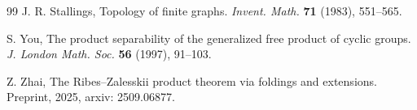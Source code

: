 \documentclass[11pt]{amsart}
\theoremstyle{definition}
\theoremstyle{definition}
\numberwithin{equation}{section}
\begin{document}
\begin{thebibliography}{99}
J. R. Stallings, 
Topology of finite graphs. \textit{Invent. Math.} {\bf 71} (1983), 551--565.

S. You,
The product separability of the generalized free product of cyclic groups.
\textit{J. London Math. Soc.} {\bf 56} (1997), 91--103.

Z. Zhai,
The Ribes--Zalesskii product theorem via foldings and extensions.
Preprint, 2025, arxiv: 2509.06877.




\end{thebibliography}
\end{document}
